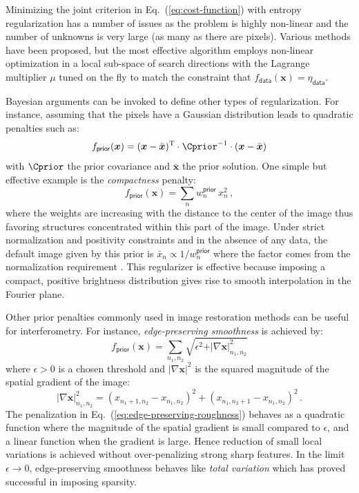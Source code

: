 \documentclass{article}
\newcommand{\Tag}[1]{\mathsf{#1}}        %
\newcommand{\V}[1]{\boldsymbol{#1}}      %
\newcommand{\T}{^\mathrm{T}}             %
\newcommand{\QuadTerm}[2]{ #2\T\cdot #1\cdot #2}
\newcommand{\abs}[1]{\vert #1\vert}
\newcommand{\Eq}[1]{Eq.~(\ref{#1})}
\newcommand{\Param}{x}
\newcommand{\VParam}{\V{\Param}}
\newcommand{\DataTag}{\Tag{data}}
\newcommand{\PriorTag}{\Tag{prior}}
\newcommand{\DataLevel}{\eta_\DataTag}
\newcommand{\Fcost}{f}
\newcommand{\Fdata}{\Fcost_\DataTag}
\newcommand{\Fprior}{\Fcost_\PriorTag}
\begin{document}
Minimizing the joint criterion in \Eq{eq:cost-function} with entropy
regularization has a number of issues as the problem is highly non-linear and
the number of unknowns is very large (as many as there are pixels).
Various methods have been proposed, but the most effective algorithm
\citep{Skilling_Bryan-1984-maximum_entropy} employs non-linear optimization in
a local sub-space of search directions with the Lagrange multiplier $\mu$
tuned on the fly to match the constraint that $\Fdata(\VParam)=\DataLevel$.

Bayesian arguments can be invoked to define other types of regularization.
For instance, assuming that the pixels have a Gaussian distribution leads to
quadratic penalties such as:
\begin{equation}
  \label{eq:gauss-prior}
  \Fprior(\VParam) = \QuadTerm{\Cprior^{-1}}{(\VParam - \bar{\VParam})}
\end{equation}
with $\Cprior$ the prior covariance and $\bar{\VParam}$ the prior solution.
One simple but effective example is the \emph{compactness} penalty:
\begin{equation}
  \label{eq:fov-penalty}
  \Fprior(\VParam) = \sum_{n} w^\PriorTag_n\,\Param_n^2 \, ,  
\end{equation}
where the weights are increasing with the distance to the center of the image
thus favoring structures concentrated within this part of the image.  Under
strict normalization and positivity constraints and in the absence of any
data, the default image given by this prior is
$\bar{x}_n\propto1/w^\PriorTag_n$ where the factor comes from the
normalization requirement \citep{LeBesnerais_et_al-2008-interferometry}. This
regularizer is effective because imposing a compact, positive brightness
distribution gives rise to smooth interpolation in the Fourier plane.

Other prior penalties commonly used in image restoration methods can be useful
for interferometry.  For instance, \emph{edge-preserving smoothness} is
achieved by:
\begin{equation}
  \label{eq:edge-preserving-roughness}
  \Fprior(\VParam) = \sum_{n_1,n_2}
  \sqrt{\epsilon^2 + \abs{\nabla\VParam}_{n_1,n_2}^2}
\end{equation}
where $\epsilon>0$ is a chosen threshold and $\abs{\nabla\VParam}^2$ is the
squared magnitude of the spatial gradient of the image:
\begin{displaymath}
  \label{eq:spatial-gradient-magnitude}
  \abs{\nabla\VParam}_{n_1,n_2}^2 =
  (x_{n_1+1,n_2} - x_{n_1,n_2})^2 + (x_{n_1,n_2+1} - x_{n_1,n_2})^2 \, .
\end{displaymath}
The penalization in \Eq{eq:edge-preserving-roughness} behaves as a quadratic
function where the magnitude of the spatial gradient is small compared to
$\epsilon$, and a linear function when the gradient is large.  Hence reduction
of small local variations is achieved without over-penalizing strong sharp
features.  In the limit $\epsilon\rightarrow0$, edge-preserving smoothness
behaves like \emph{total variation} \citep{Rudin_et_al-1992-total_variation}
which has proved successful in imposing sparsity.
\end{document}

